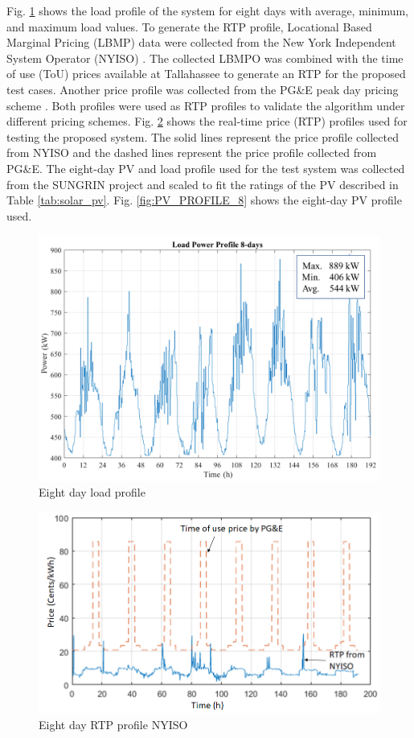 Fig. \ref{fig:LOAD_PROFILE_8} shows the load profile of the system for eight days with average, minimum, and maximum load values. To generate the RTP profile, Locational Based Marginal Pricing (LBMP) data were collected from the New York Independent System Operator (NYISO) \cite{NYISO2017}. The collected LBMPO was combined with the time of use (ToU) prices available at Tallahassee to generate an RTP for the proposed test cases. Another price profile was collected from the PG\&E peak day pricing scheme \cite{pgne}. Both profiles were used as RTP profiles to validate the algorithm under different pricing schemes. Fig. \ref{fig:RTP_PROFILE_8} shows the real-time price (RTP) profiles used for testing the proposed system. The solid lines represent the price profile collected from NYISO and the dashed lines represent the price profile collected from PG\&E. The eight-day PV and load profile used for the test system was collected from the SUNGRIN project and scaled to fit the ratings of the PV described in Table \ref{tab:solar_pv}. Fig. \ref{fig:PV_PROFILE_8} shows the eight-day PV profile used.

\begin{figure}[!ht]
    \centering
    \includegraphics[width = 0.8\linewidth]{figs/loadprofile.png}
    \caption{Eight day load profile}
    \label{fig:LOAD_PROFILE_8}
\end{figure}

\begin{figure}[!ht]
    \centering
    \includegraphics[width = 0.8\linewidth]{figs/Price_profiles.png}
    \caption{Eight day RTP profile NYISO}
    \label{fig:RTP_PROFILE_8}
\end{figure}

